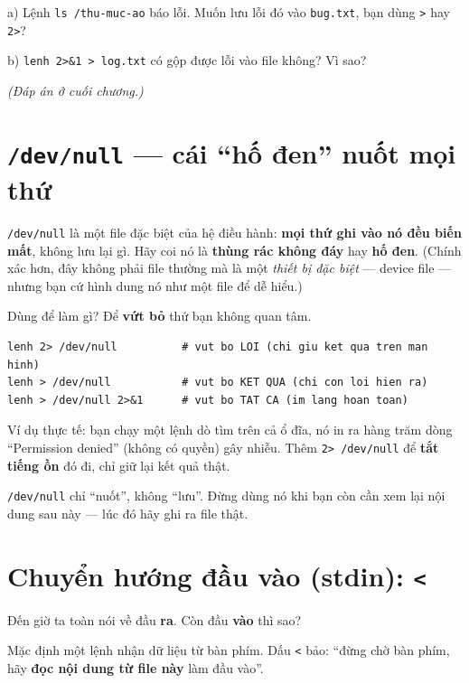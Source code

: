 \documentclass[12pt,a4paper]{article}
\newcommand{\cmd}[1]{\texttt{#1}}
\begin{document}
\begin{checkbox}[title={Tự kiểm tra 4}]
a) Lệnh \cmd{ls /thu-muc-ao} báo lỗi. Muốn lưu lỗi đó vào \cmd{bug.txt}, bạn dùng \cmd{>} hay \cmd{2>}?

b) \cmd{lenh 2>\&1 > log.txt} có gộp được lỗi vào file không? Vì sao?

\textit{(Đáp án ở cuối chương.)}
\end{checkbox}

\section{\texttt{/dev/null} --- cái ``hố đen'' nuốt mọi thứ}

\cmd{/dev/null} là một file đặc biệt của hệ điều hành: \textbf{mọi thứ ghi vào nó đều biến mất}, không lưu lại gì. Hãy coi nó là \textbf{thùng rác không đáy} hay \textbf{hố đen}. (Chính xác hơn, đây không phải file thường mà là một \textit{thiết bị đặc biệt} --- device file --- nhưng bạn cứ hình dung nó như một file để dễ hiểu.)

Dùng để làm gì? Để \textbf{vứt bỏ} thứ bạn không quan tâm.

\begin{Verbatim}
lenh 2> /dev/null          # vut bo LOI (chi giu ket qua tren man hinh)
lenh > /dev/null           # vut bo KET QUA (chi con loi hien ra)
lenh > /dev/null 2>&1      # vut bo TAT CA (im lang hoan toan)
\end{Verbatim}

Ví dụ thực tế: bạn chạy một lệnh dò tìm trên cả ổ đĩa, nó in ra hàng trăm dòng ``Permission denied'' (không có quyền) gây nhiễu. Thêm \cmd{2> /dev/null} để \textbf{tắt tiếng ồn} đó đi, chỉ giữ lại kết quả thật.

\begin{notebox}[title={Lưu ý}]
\cmd{/dev/null} chỉ ``nuốt'', không ``lưu''. Đừng dùng nó khi bạn còn cần xem lại nội dung sau này --- lúc đó hãy ghi ra file thật.
\end{notebox}

\section{Chuyển hướng đầu vào (stdin): \texttt{<}}

Đến giờ ta toàn nói về đầu \textbf{ra}. Còn đầu \textbf{vào} thì sao?

Mặc định một lệnh nhận dữ liệu từ bàn phím. Dấu \cmd{<} bảo: ``đừng chờ bàn phím, hãy \textbf{đọc nội dung từ file này} làm đầu vào''.
\end{document}
